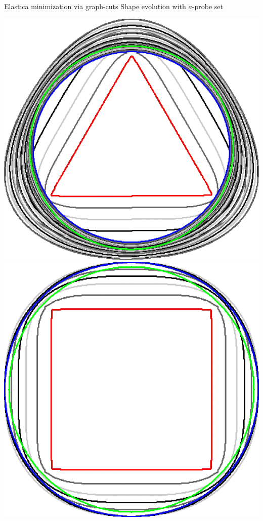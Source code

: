 \begin{frame}
{Elastica minimization via graph-cuts}
{Shape evolution with $a$-probe set}

\begin{minipage}{0.25\textwidth}
\center
\includegraphics[scale=0.06]{figures/graphcut/with-neighborhood-flow/radius_16/triangle.png}\\[1em]
\includegraphics[scale=0.06]{figures/graphcut/with-neighborhood-flow/radius_16/square.png}\\[1em]

\end{minipage}
\end{frame}
